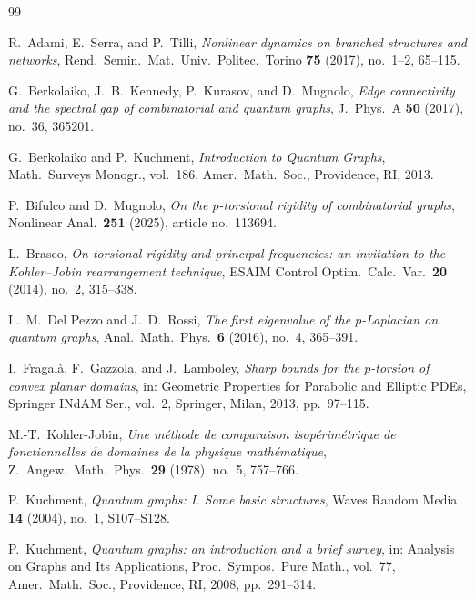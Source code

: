 \documentclass[12pt,a4paper]{article}
\numberwithin{equation}{section}
\begin{document}
\begin{thebibliography}{99}
	
	R.~Adami, E.~Serra, and P.~Tilli,
	\textit{Nonlinear dynamics on branched structures and networks},
	Rend.\ Semin.\ Mat.\ Univ.\ Politec.\ Torino \textbf{75} (2017),
	no.~1--2, 65--115.
	
	G.~Berkolaiko, J.~B.~Kennedy, P.~Kurasov, and D.~Mugnolo,
	\textit{Edge connectivity and the spectral gap of combinatorial and
		quantum graphs},
	J.\ Phys.\ A \textbf{50} (2017), no.~36, 365201.
	
	G.~Berkolaiko and P.~Kuchment,
	\textit{Introduction to Quantum Graphs},
	Math.\ Surveys Monogr., vol.~186, Amer.\ Math.\ Soc., Providence, RI,
	2013.
	
	P.~Bifulco and D.~Mugnolo,
	\textit{On the $p$-torsional rigidity of combinatorial graphs},
	Nonlinear Anal.\ \textbf{251} (2025), article no.~113694.
	
	L.~Brasco,
	\textit{On torsional rigidity and principal frequencies: an invitation
		to the Kohler--Jobin rearrangement technique},
	ESAIM Control Optim.\ Calc.\ Var.\ \textbf{20} (2014), no.~2, 315--338.
	
	L.~M.~Del Pezzo and J.~D.~Rossi,
	\textit{The first eigenvalue of the $p$-Laplacian on quantum graphs},
	Anal.\ Math.\ Phys.\ \textbf{6} (2016), no.~4, 365--391.
	
	I.~Fragal\`a, F.~Gazzola, and J.~Lamboley,
	\textit{Sharp bounds for the $p$-torsion of convex planar domains},
	in: Geometric Properties for Parabolic and Elliptic PDEs,
	Springer INdAM Ser., vol.~2, Springer, Milan, 2013, pp.~97--115.
	
	M.-T.~Kohler-Jobin,
	\textit{Une m\'ethode de comparaison isop\'erim\'etrique de
		fonctionnelles de domaines de la physique math\'ematique},
	Z.\ Angew.\ Math.\ Phys.\ \textbf{29} (1978), no.~5, 757--766.
	
	P.~Kuchment,
	\textit{Quantum graphs: I. Some basic structures},
	Waves Random Media \textbf{14} (2004), no.~1, S107--S128.
	
	P.~Kuchment,
	\textit{Quantum graphs: an introduction and a brief survey},
	in: Analysis on Graphs and Its Applications,
	Proc.\ Sympos.\ Pure Math., vol.~77, Amer.\ Math.\ Soc.,
	Providence, RI, 2008, pp.~291--314.
	

\end{thebibliography}
\end{document}
